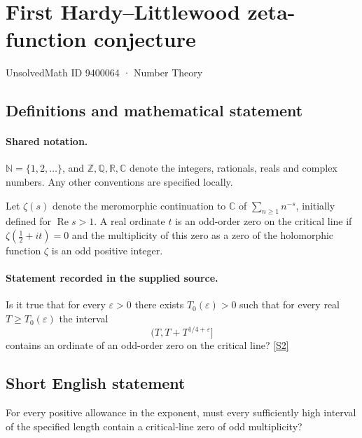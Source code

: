 \documentclass[11pt]{article}
\newcommand{\sref}[2]{\hyperlink{source:#1:#2}{[S#2]}}
\begin{document}
\setcounter{section}{9400063}
\section{First Hardy–Littlewood zeta-function conjecture}\label{9400064}
{\small\sffamily UnsolvedMath ID 9400064 · Number Theory}
\subsection{Definitions and mathematical statement}

\paragraph{Shared notation.}$\mathbb N=\{1,2,\ldots\}$, and $\mathbb Z,\mathbb Q,\mathbb R,\mathbb C$ denote the integers, rationals, reals and complex numbers. Any other conventions are specified locally.


Let $\zeta(s)$ denote the meromorphic continuation to $\mathbb C$ of $\sum_{n\ge1}n^{-s}$, initially defined for $\operatorname{Re}s>1$. A real ordinate $t$ is an odd-order zero on the critical line if $\zeta(\tfrac12+it)=0$ and the multiplicity of this zero as a zero of the holomorphic function $\zeta$ is an odd positive integer.
\paragraph{Statement recorded in the supplied source.}
Is it true that for every $\varepsilon>0$ there exists $T_0(\varepsilon)>0$ such that for every real $T\ge T_0(\varepsilon)$ the interval
\[\bigl(T,T+T^{1/4+\varepsilon}\bigr]\]
contains an ordinate of an odd-order zero on the critical line? \sref{9400064}{2}
\subsection{Short English statement}
For every positive allowance in the exponent, must every sufficiently high interval of the specified length contain a critical-line zero of odd multiplicity?
\end{document}
